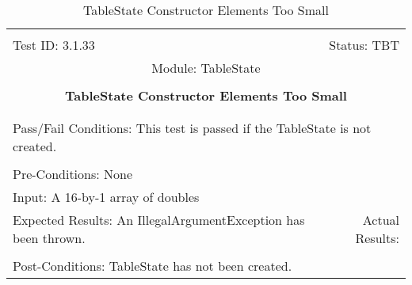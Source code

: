 \documentclass[titlepage]{article}
\begin{document}
\begin{center}%
\begin{table}
\begin{tabular}{|l r|}\hline&\\[-2mm]
	Test ID: 3.1.33	&Status: TBT\\[-3mm]
	\multicolumn{2}{|c|}{Module: TableState}\\&\\
	\multicolumn{2}{|c|}{\textbf{\large{TableState Constructor Elements Too Small}}}\\&\\\hline&\\[-3mm]
	\multicolumn{2}{|p{\textwidth}|}{Pass/Fail Conditions: This test is passed if the TableState is not created.}\\[1mm]\hline&\\[-3mm]
	\multicolumn{2}{|p{\textwidth}|}{Pre-Conditions: None}\\[4mm]
	\multicolumn{2}{|p{\textwidth}|}{Input: A 16-by-1 array of doubles}\\[2mm]\hline
	\multicolumn{1}{|p{0.49\textwidth}}{Expected Results: An IllegalArgumentException has been thrown.}	&\multicolumn{1}{|p{0.45\textwidth}|}{Actual Results: }\\\hline&\\[-3mm]
	\multicolumn{2}{|p{\textwidth}|}{Post-Conditions: TableState has not been created.}\\\hline
\end{tabular}
\caption{TableState Constructor Elements Too Small}
\end{table}
\end{center}
\end{document}
